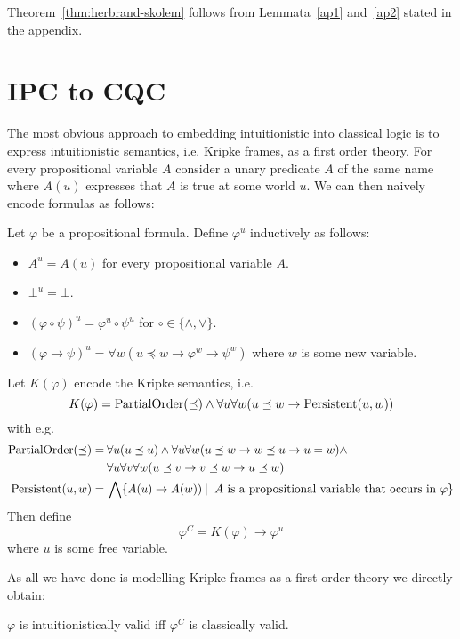 \documentclass[a4paper,UKenglish,cleveref, autoref, thm-restate]{lipics-v2021}
\begin{document}
Theorem~\ref{thm:herbrand-skolem} follows from Lemmata~\ref{ap1} and~\ref{ap2} stated in the appendix.


\section{IPC to CQC}

The most obvious approach to embedding intuitionistic into classical logic is to express intuitionistic semantics, i.e. Kripke frames, as a first order theory. For every propositional variable $A$ consider a unary predicate $A$ of the same name where $A(u)$ expresses that $A$ is true at some world $u$. We can then naively encode formulas as follows:

\begin{definition}
	Let $\varphi$ be a propositional formula. Define $\varphi^{u}$ inductively as follows:
	\begin{itemize}
		\item $A^{u} = A(u)$ for every propositional variable $A$.
		\item $\bot^u = \bot$.
		\item $(\varphi\circ\psi)^u = \varphi^u\circ\psi^u$ for $\circ\in\{\wedge, \vee\}$.
		\item $(\varphi\to \psi)^u = \forall w(u\preceq w\to\varphi^{w}\to\psi^{w})$ where $w$ is some new variable.
	\end{itemize}
	Let $K(\varphi)$ encode the Kripke semantics, i.e.
	$$K(\varphi) = \text{\normalfont PartialOrder}(\preceq)\wedge\forall u\forall w(u\preceq w\to \text{\normalfont Persistent}(u, w))$$
	with e.g.
	\begin{align*}
		\text{\normalfont PartialOrder}(\preceq) =&\:\forall u(u\preceq u)\wedge\forall u\forall w(u\preceq w\to w\preceq u\to u = w)\wedge\\&\:\forall u\forall v\forall w(u\preceq v\to v\preceq w\to u\preceq w)\\
		\text{\normalfont Persistent}(u, w)=&\:\bigwedge \{A(u)\to A(w))\:|\: \text{ $A$ is a propositional variable that occurs in $\varphi$}\}
	\end{align*}
	Then define
	$$\varphi^{C} = K(\varphi)\to \varphi^{u}$$
	where $u$ is some free variable.
\end{definition}

\noindent As all we have done is modelling Kripke frames as a first-order theory we directly obtain:

\begin{lemma}
	$\varphi$ is intuitionistically valid iff $\varphi^C$ is classically valid.
\end{lemma}
\end{document}
